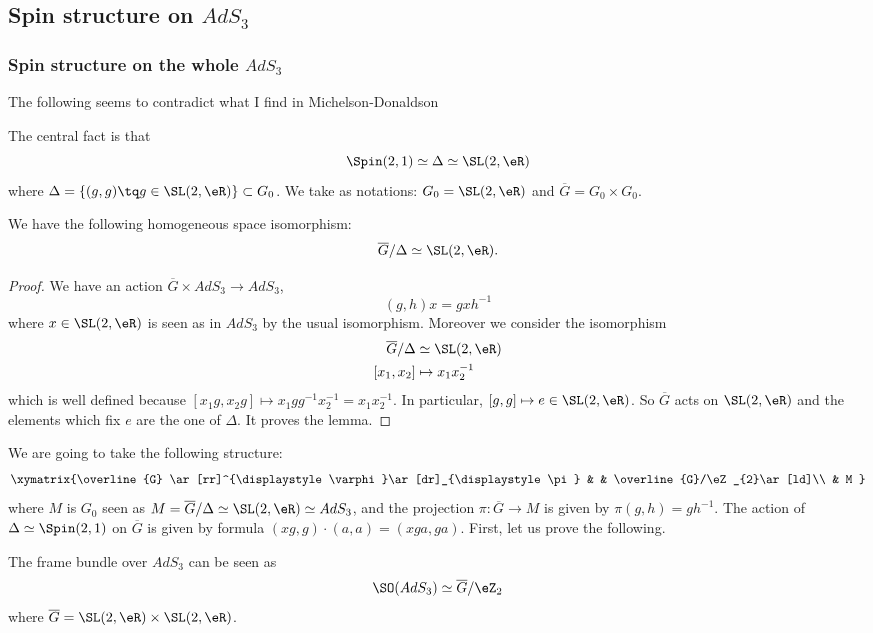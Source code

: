 \subsection{Spin structure on \texorpdfstring{$AdS_3$}{AdS3} }

\subsubsection{Spin structure on the whole \texorpdfstring{$AdS_3$}{AdS3} }

\begin{probleme}
    The following seems to contradict what I find in Michelson-Donaldson
\end{probleme}
The central fact is that
\[
  \Spin(2,1)\simeq\Delta\simeq\SL(2,\eR)
\]
where $\Delta=\{ (g,g)\tq g\in\SL(2,\eR) \}\subset G_0$. We take as notations: $G_{0}=\SL(2,\eR)$ and $\overline{G}=G_0\times G_{0}$.

\begin{lemma}
We have the following homogeneous space isomorphism:
\[
  \overline{G}/\Delta\simeq\SL(2,\eR).
\]
\end{lemma}

\begin{proof}

We have an action $\overline{G}\times AdS_3\to AdS_3$,
\begin{equation} \label{EqActghgxh}
  (g,h)x=gxh^{-1}
\end{equation}
where $x\in\SL(2,\eR)$ is seen as in $AdS_3$ by the usual isomorphism. Moreover we consider the isomorphism
\begin{align}
\overline{G}/\Delta&\simeq\SL(2,\eR)\\
[x_1,x_2]&\mapsto x_1x_2^{-1}
\end{align}
which is well defined because $[x_1g,x_2g]\mapsto x_1gg^{-1}x_2^{-1}=x_1x_2^{-1}$. In particular, $[g,g]\mapsto e\in\SL(2,\eR)$. So $\overline{G}$ acts on $\SL(2,\eR)$ and the elements which fix $e$ are the one of $\Delta$. It proves the lemma.
\end{proof}

We are going to take the following structure:
\begin{equation}  \label{EqScSpinAdS}
  \xymatrix{%
   \overline{G} \ar[rr]^{\displaystyle\varphi}\ar[dr]_{\displaystyle\pi}    &   &   \overline{G}/\eZ_{2}\ar[ld]\\
                        & M
}
\end{equation}
where $M$ is $G_0$ seen as $M=\overline{G}/\Delta\simeq \SL(2,\eR)\simeq AdS_3$, and the projection $\pi\colon \overline{G}\to M$ is given by $\pi(g,h)=gh^{-1}$. The action of $\Delta\simeq \Spin(2,1)$ on $\overline{G}$ is given by formula $(xg,g)\cdot (a,a)=(xga,ga)$. First, let us prove the following.
\begin{proposition}
The frame bundle over $AdS_3$ can be seen as
\[
  \SO(AdS_3)\simeq \overline{G}/\eZ_{2}
\]
where $\overline{G}=\SL(2,\eR)\times\SL(2,\eR)$.
\end{proposition}

